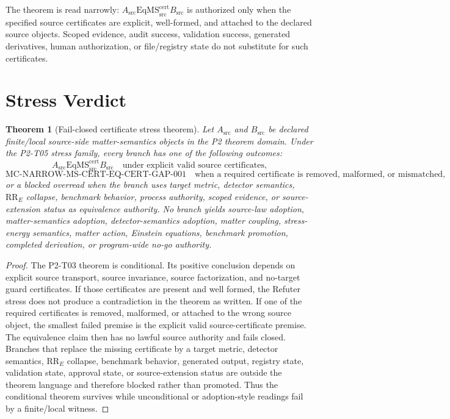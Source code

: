 \documentclass[11pt]{article}
\newcommand{\EqMScert}{\mathrm{EqMS}^{\mathrm{cert}}_{\mathrm{src}}}
\newcommand{\Asrc}{A_{\mathrm{src}}}
\newcommand{\Bsrc}{B_{\mathrm{src}}}
\newcommand{\RRE}{\mathrm{RR}_{E}}
\newcommand{\WitnessId}{\mathrm{MC}\text{-}\mathrm{NARROW}\text{-}\mathrm{MS}\text{-}\mathrm{CERT}\text{-}\mathrm{EQ}\text{-}\mathrm{CERT}\text{-}\mathrm{GAP}\text{-}001}
\newtheorem{theorem}{Theorem}
\begin{document}
The theorem is read narrowly: \(\Asrc \EqMScert \Bsrc\) is authorized only when
the specified source certificates are explicit, well-formed, and attached to
the declared source objects. Scoped evidence, audit success, validation
success, generated derivatives, human authorization, or file/registry state do
not substitute for such certificates.

\section{Stress Verdict}

\begin{theorem}[Fail-closed certificate stress theorem]
Let \(\Asrc\) and \(\Bsrc\) be declared finite/local source-side
matter-semantics objects in the P2 theorem domain. Under the P2-T05 stress
family, every branch has one of the following outcomes:
\[
  \Asrc \EqMScert \Bsrc
  \quad \text{under explicit valid source certificates,}
\]
\[
  \WitnessId
  \quad \text{when a required certificate is removed, malformed, or mismatched,}
\]
or a blocked overread when the branch uses target metric, detector semantics,
\(\RRE\) collapse, benchmark behavior, process authority, scoped evidence, or
source-extension status as equivalence authority. No branch yields source-law
adoption, matter-semantics adoption, detector-semantics adoption, matter
coupling, stress-energy semantics, matter action, Einstein equations,
benchmark promotion, completed derivation, or program-wide no-go authority.
\end{theorem}

\begin{proof}
The P2-T03 theorem is conditional. Its positive conclusion depends on explicit
source transport, source invariance, source factorization, and no-target
guard certificates. If those certificates are present and well formed, the
Refuter stress does not produce a contradiction in the theorem as written.
If one of the required certificates is removed, malformed, or attached to the
wrong source object, the smallest failed premise is the explicit valid
source-certificate premise. The equivalence claim then has no lawful source
authority and fails closed. Branches that replace the missing certificate by a
target metric, detector semantics, \(\RRE\) collapse, benchmark behavior,
generated output, registry state, validation state, approval state, or
source-extension status are outside the theorem language and therefore
blocked rather than promoted. Thus the conditional theorem survives while
unconditional or adoption-style readings fail by a finite/local witness.
\end{proof}
\end{document}
